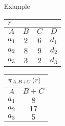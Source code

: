 \begin{multicols}{2}
\begin{CheatsheetEntryFrame}
        \SubsectionFrameAddSeparation
        \begin{RelAlgSubsection}{Example}
        \begin{center}
            {\footnotesize%
                \begin{tabular}{|cccc|}
                    \multicolumn{4}{l}{\normalsize $r$}
                        \\ \hline
                    \multicolumn{1}{|c}{$A$}
                        & \multicolumn{1}{c}{$B$}
                        & \multicolumn{1}{c}{$C$}
                        & \multicolumn{1}{c|}{$D$}
                        \\ \hline\hline
                    $a_1$ & $2$ & $6$ & $d_1$ \\
                    $a_2$ & $8$ & $9$ & $d_2$ \\
                    $a_3$ & $3$ & $2$ & $d_3$ \\ \hline
                \end{tabular}
                \qquad \qquad
                \begin{tabular}{|cc|}
                    \multicolumn{2}{l}{\normalsize $\operatorname{\pi}_{A, B + C}{(r)}$}
                        \\ \hline
                    \multicolumn{1}{|c}{$A$}
                        & \multicolumn{1}{c|}{$B + C$}
                        \\ \hline\hline
                    $a_1$ & $8$ \\
                    $a_2$ & $17$ \\
                    $a_3$ & $5$ \\ \hline
                \end{tabular}
            }
        \end{center}
        \end{RelAlgSubsection}

    \end{CheatsheetEntryFrame}

\end{multicols}
\newpage
\begin{multicols}{2}

    \begin{CheatsheetEntryFrame}


    \end{CheatsheetEntryFrame}
    
\end{multicols}

